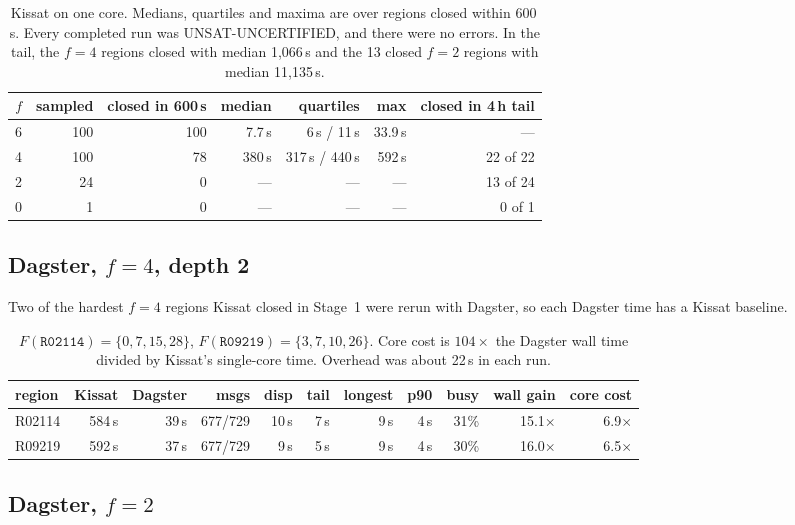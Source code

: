 \documentclass[11pt,a4paper]{article}
\theoremstyle{definition}
\newcommand{\code}[1]{\texttt{#1}}
\newcommand{\st}[1]{\textsf{#1}}
\begin{document}
\begin{table}[H]
\centering
\begin{tabular}{@{}rrrrrrr@{}}
\toprule
$f$ & sampled & closed in 600\,s & median & quartiles & max & closed in 4\,h tail \\
\midrule
6 & 100 & 100 & 7.7\,s & 6\,s / 11\,s & 33.9\,s & --- \\
4 & 100 & 78 & 380\,s & 317\,s / 440\,s & 592\,s & 22 of 22 \\
2 & 24 & 0 & --- & --- & --- & 13 of 24 \\
0 & 1 & 0 & --- & --- & --- & 0 of 1 \\
\bottomrule
\end{tabular}
\caption{Kissat on one core. Medians, quartiles and maxima are over regions closed within
600\,s. Every completed run was \st{UNSAT-UNCERTIFIED}, and there were no errors. In the tail,
the $f=4$ regions closed with median 1{,}066\,s and the 13 closed $f=2$ regions with median
11{,}135\,s.}
\label{tab:kissat}
\end{table}

\subsection{Dagster, $f=4$, depth 2}

Two of the hardest $f=4$ regions Kissat closed in Stage~1 were rerun with Dagster, so each
Dagster time has a Kissat baseline.

\begin{table}[H]
\centering
\small
\begin{tabular}{@{}lrrrrrrrrrr@{}}
\toprule
region & Kissat & Dagster & msgs & disp & tail & longest & p90 & busy & wall gain & core cost \\
\midrule
R02114 & 584\,s & 39\,s & 677/729 & 10\,s & 7\,s & 9\,s & 4\,s & 31\% & 15.1$\times$ & 6.9$\times$ \\
R09219 & 592\,s & 37\,s & 677/729 & 9\,s & 5\,s & 9\,s & 4\,s & 30\% & 16.0$\times$ & 6.5$\times$ \\
\bottomrule
\end{tabular}
\caption{$F(\code{R02114})=\{0,7,15,28\}$, $F(\code{R09219})=\{3,7,10,26\}$. Core cost is
$104\times$ the Dagster wall time divided by Kissat's single-core time. Overhead was about 22\,s
in each run.}
\label{tab:f4}
\end{table}

\subsection{Dagster, $f=2$}
\end{document}
